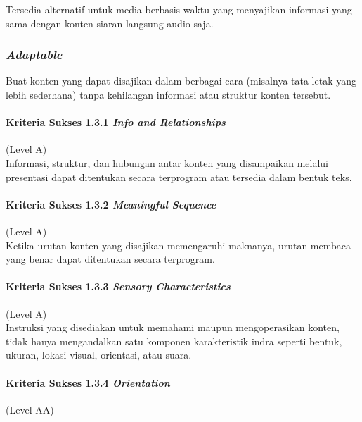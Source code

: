 \documentclass[a4paper,twoside]{article}
\begin{document}
\begin{enumerate}
		Tersedia alternatif untuk media berbasis waktu yang menyajikan informasi yang sama dengan konten siaran langsung audio saja.

		\subsubsection*{\textit{Adaptable}}
		\label{sec:adaptable}
		Buat konten yang dapat disajikan dalam berbagai cara (misalnya tata letak yang lebih sederhana) tanpa kehilangan informasi atau struktur konten tersebut.

		\paragraph{Kriteria Sukses 1.3.1 \textit{Info and Relationships}}
		\label{sec:kriteria_sukses_1.3.1}
		(Level A)\\

		Informasi, struktur, dan hubungan antar konten yang disampaikan melalui presentasi dapat ditentukan secara terprogram atau tersedia dalam bentuk teks. 

		\paragraph{Kriteria Sukses 1.3.2 \textit{Meaningful Sequence}}
		\label{sec:kriteria_sukses_1.3.2}
		(Level A)\\

		Ketika urutan konten yang disajikan memengaruhi maknanya, urutan membaca yang benar dapat ditentukan secara terprogram.

		\paragraph{Kriteria Sukses 1.3.3 \textit{Sensory Characteristics}}
		\label{sec:kriteria_sukses_1.3.3}
		(Level A)\\

		Instruksi yang disediakan untuk memahami maupun mengoperasikan konten, tidak hanya mengandalkan satu komponen karakteristik indra seperti bentuk, ukuran, lokasi visual, orientasi, atau suara.

		\paragraph{Kriteria Sukses 1.3.4 \textit{Orientation}}
		\label{sec:kriteria_sukses_1.3.4}
		(Level AA)\\


\end{enumerate}
\end{document}
